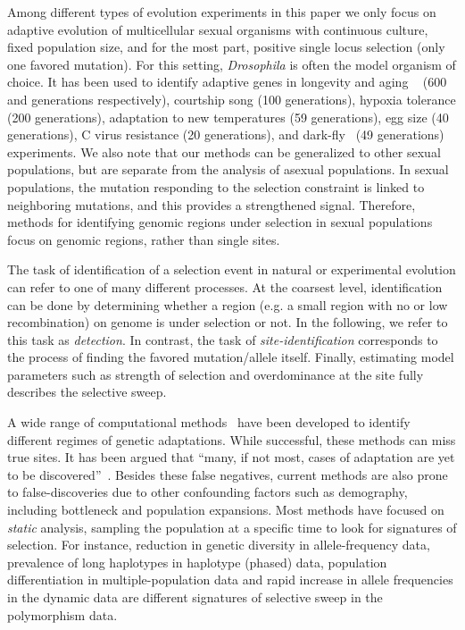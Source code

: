 \documentclass[11pt]{article}
\begin{document}
Among different types of evolution experiments
\cite{Barrick2013Genome,schlotterer2015combining} in this paper we
only focus on adaptive evolution of multicellular sexual organisms
with continuous culture, fixed population size, and for the most part,
positive single locus selection (only one favored mutation).  For this
setting, \emph{Drosophila} is often the model organism of choice. It
has been used to identify adaptive genes in longevity and aging
~\cite{burke2010genome,remolina2012genomic} (600 and generations
respectively), courtship song \cite{turner2011population} (100
generations), hypoxia tolerance \cite{zhou2011experimental} (200
generations), adaptation to new
temperatures\cite{orozco2012adaptation,tobler2014massive} (59
generations), egg size \cite{jha2015whole} (40 generations), C virus
resistance \cite{martins2014host} (20 generations), and
dark-fly~\cite{izutsu2015dynamics} (49 generations) experiments. We
also note that our methods can be generalized to other sexual
populations, but are separate from the analysis of asexual
populations. In sexual populations, the mutation responding to the
selection constraint is linked to neighboring mutations, and this
provides a strengthened signal. Therefore, methods for identifying
genomic regions under selection in sexual populations focus on genomic
regions, rather than single sites.

The task of identification of a selection event in natural or
experimental evolution can refer to one of many different
processes. At the coarsest level, identification can be done by
determining whether a region (e.g. a small region with no or low
recombination) on genome is under selection or not.  In the following,
we refer to this task as \emph{detection}. In contrast, the task of
\emph{site-identification} corresponds to the process of finding the
favored mutation/allele itself. Finally, estimating model parameters
such as strength of selection and overdominance at the site fully
describes the selective sweep.

A wide range of computational methods~\cite{vitti2013detecting} have
been developed to identify different regimes of genetic
adaptations. While successful, these methods can miss true sites. It
has been argued that ``many, if not most, cases of adaptation are yet
to be discovered''~\cite{messer2013population}. Besides these false
negatives, current methods are also prone to false-discoveries due to
other confounding factors such as demography, including bottleneck and
population expansions. Most methods have focused on \emph{static}
analysis, sampling the population at a specific time to look for
signatures of selection. For instance, reduction in genetic
diversity\cite{tajima1989statistical,fay2000hitchhiking,ronen2013learning}
in allele-frequency data, prevalence of long haplotypes
\cite{sabeti2006positive,vitti2013detecting} in haplotype (phased)
data, population differentiation
\cite{holsinger2009genetics,burke2010genome} in multiple-population
data and rapid increase in allele frequencies
\cite{bergland2014genomic} in the dynamic data are different
signatures of selective sweep in the polymorphism data.  
\end{document}
